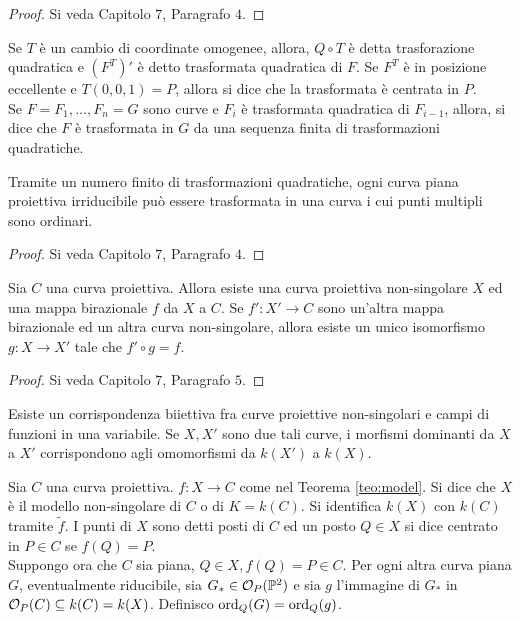     \begin{proof}
        Si veda \cite{fulton} Capitolo $7$, Paragrafo $4$.
    \end{proof}
    Se $T$ è un cambio di coordinate omogenee, allora, $Q \circ T$ è detta trasforazione quadratica e $(F^T)'$ è detto trasformata quadratica di $F$. Se $F^T$ è in posizione eccellente e $T(0,0,1) = P$, allora si dice che la trasformata è centrata in $P$.\\
    Se $F = F_1,\ldots,F_n = G$ sono curve e $F_i$ è trasformata quadratica di $F_{i-1}$, allora, si dice che $F$ è trasformata in $G$ da una sequenza finita di trasformazioni quadratiche.
    \begin{proposizione}
        Tramite un numero finito di trasformazioni quadratiche, ogni curva piana proiettiva irriducibile può essere trasformata in una curva i cui punti multipli sono ordinari.
    \end{proposizione}
    \begin{proof}
        Si veda \cite{fulton} Capitolo $7$, Paragrafo $4$.
    \end{proof}
    \begin{teorema}\label{teo:model}
        Sia $C$ una curva proiettiva. Allora esiste una curva proiettiva non-singolare $X$ ed una mappa birazionale $f$ da $X$ a $C$. Se $f': X' \to C$ sono un'altra mappa birazionale ed un altra curva non-singolare, allora esiste un unico isomorfismo $g: X \to X'$ tale che $f' \circ g = f$.
    \end{teorema}
    \begin{proof}
        Si veda \cite{fulton} Capitolo $7$, Paragrafo $5$.
    \end{proof}
    \begin{corollario}
        Esiste un corrispondenza biiettiva fra curve proiettive non-singolari e campi di funzioni in una variabile. Se $X,X'$ sono due tali curve, i morfismi dominanti da $X$ a $X'$ corrispondono agli omomorfismi da $k(X')$ a $k(X)$.
    \end{corollario}
    Sia $C$ una curva proiettiva. $f : X \to C$ come nel Teorema \ref{teo:model}. Si dice che $X$ è il modello non-singolare di $C$ o di $K = k(C)$. Si identifica $k(X)$ con $k(C)$ tramite $\tilde{f}$. I punti di $X$ sono detti posti di $C$ ed un posto $Q \in X$ si dice centrato in $P \in C$ se 
    $f(Q) = P$.\\
    Suppongo ora che $C$ sia piana, $Q \in X, f(Q) = P \in C$. Per ogni altra curva piana $G$, eventualmente riducibile, sia $G_* \in \mathcal{O}_P(\mathbb{P}^2)$ e sia $g$ l'immagine di $G_*$ in $\mathcal{O}_P(C) \subseteq k(C) = k(X)$. Definisco $\operatorname{ord}_Q(G) = \operatorname{ord}_Q(g)$.\\
